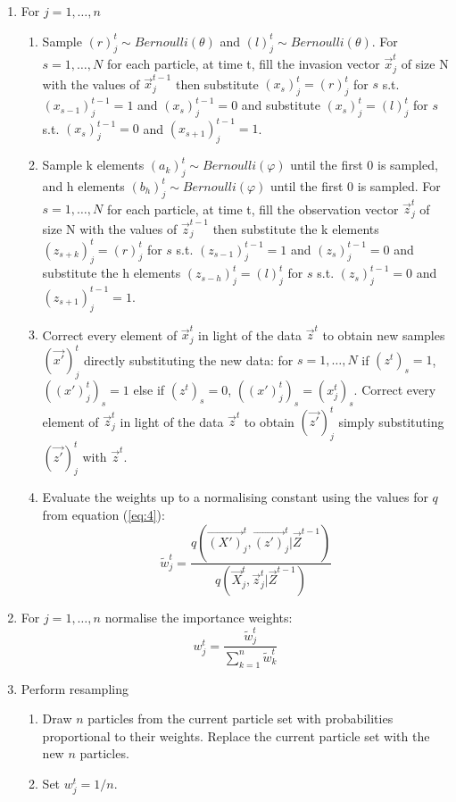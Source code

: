 \begin{algorithm}[H]
\begin{algorithmic}
\begin{enumerate}
	\item For $j = 1, \dots , n$
	\begin{enumerate}
  		\item Sample $(r)^t_j \sim Bernoulli(\theta)$ and $(l)^t_j \sim Bernoulli(\theta)$. For $s = 1, \dots, N$ for each particle, at time t, fill the invasion vector $\vec{x}_j^t$ of size N with the values of $\vec{x}_j^{t-1}$ then substitute $(x_s)^t_j = (r)^t_j$ for $s$ s.t. $(x_{s-1})^{t-1}_j = 1$ and $(x_s)^{t-1}_j = 0$ and substitute $(x_s)^t_j = (l)^t_j$ for $s$ s.t. $(x_s)^{t-1}_j = 0$ and $(x_{s+1})^{t-1}_j = 1$.
  		\item Sample k elements $(a_k)^t_j \sim Bernoulli(\varphi)$ until the first 0 is sampled, and h elements $(b_h)^t_j \sim Bernoulli(\varphi)$ until the first 0 is sampled. For $s = 1, \dots, N$ for each particle, at time t, fill the observation vector $\vec{z}_j^t$ of size N with the values of $\vec{z}_j^{t-1}$ then substitute the k elements $(z_{s+k})^t_j = (r)^t_j$ for $s$ s.t. $(z_{s-1})^{t-1}_j = 1$ and $(z_s)^{t-1}_j = 0$ and substitute the h elements $(z_{s-h})^t_j = (l)^t_j$ for $s$ s.t. $(z_s)^{t-1}_j = 0$ and $(z_{s+1})^{t-1}_j = 1$.
		\item Correct every element of $\vec{x}^t_j$ in light of the data $\vec{z}^t$ to obtain new samples $(\vec{x'})^t_j$ directly substituting the new data: for $s = 1, \dots ,N$ if $(z^t)_s = 1$, $((x')_j^t)_s = 1$ else if $(z^t)_s = 0$, $((x')_j^t)_s = (x^t_j)_s$. Correct every element of $\vec{z}^t_j$ in light of the data $\vec{z}^t$ to obtain $(\vec{z'})^t_j$ simply substituting $(\vec{z'})^t_j$ with $\vec{z}^t$.
		\item Evaluate the weights up to a normalising constant using the values for $q$ from equation (\ref{eq:4}):
		\[
		\tilde{w}^{t}_{j} = \frac{q(\vec{(X')}^{t}_j, \vec{(z')}^{t}_j | \vec{Z}^{t-1})}{q(\vec{X}^{t}_j, \vec{z}^{t}_j | \vec{Z}^{t-1})}
		\]
	\end{enumerate}
	\item For $j = 1, \dots , n$ normalise the importance weights:
	\[
	w^{t}_{j} = \frac{\tilde{w}^t_j}{\sum_{k=1}^{n}\tilde{w}^{t}_k}
	\]
	\item Perform resampling
	\begin{enumerate}
	    \item Draw $n$ particles from the current particle set with probabilities proportional to their weights. Replace the current particle set with the new $n$ particles.
	    \item Set $w^t_j=1/n$.
	\end{enumerate}
\end{enumerate}
  
 \end{algorithmic}
\end{algorithm}

